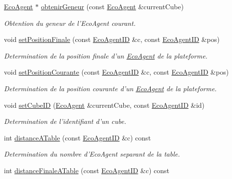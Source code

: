 \begin{CompactItemize}
\hyperlink{classEcoAgent}{EcoAgent} $\ast$ \hyperlink{classPlateformeMondeDesCubes_fd0d16680115dc57d5a43f433dde3592}{obtenirGeneur} (const \hyperlink{classEcoAgent}{EcoAgent} \&currentCube)
\begin{CompactList}\small\item\em Obtention du geneur de l'EcoAgent courant. \item\end{CompactList}\item 
void \hyperlink{classPlateformeMondeDesCubes_315f30b3c7c1e8bc9ec828a66a5813e5}{setPositionFinale} (const \hyperlink{classEcoAgentID}{EcoAgentID} \&c, const \hyperlink{classEcoAgentID}{EcoAgentID} \&pos)
\begin{CompactList}\small\item\em Determination de la position finale d'un \hyperlink{classEcoAgent}{EcoAgent} de la plateforme. \item\end{CompactList}\item 
void \hyperlink{classPlateformeMondeDesCubes_ecc518787fb8231be37e7b8eb3c5390e}{setPositionCourante} (const \hyperlink{classEcoAgentID}{EcoAgentID} \&c, const \hyperlink{classEcoAgentID}{EcoAgentID} \&pos)
\begin{CompactList}\small\item\em Determination de la position courante d'un \hyperlink{classEcoAgent}{EcoAgent} de la plateforme. \item\end{CompactList}\item 
void \hyperlink{classPlateformeMondeDesCubes_c99c6db4dfc2b193d8697103bec3d4d4}{setCubeID} (\hyperlink{classEcoAgent}{EcoAgent} \&currentCube, const \hyperlink{classEcoAgentID}{EcoAgentID} \&id)
\begin{CompactList}\small\item\em Determination de l'identifiant d'un cube. \item\end{CompactList}\item 
int \hyperlink{classPlateformeMondeDesCubes_4a5d7a96766cf9a3e1acae5b3d8263fa}{distanceATable} (const \hyperlink{classEcoAgentID}{EcoAgentID} \&c) const 
\begin{CompactList}\small\item\em Determination du nombre d'EcoAgent separant de la table. \item\end{CompactList}\item 
int \hyperlink{classPlateformeMondeDesCubes_7f694f86cf4a9502cf6bba2d6eb5a371}{distanceFinaleATable} (const \hyperlink{classEcoAgentID}{EcoAgentID} \&c) const 

\end{CompactItemize}

